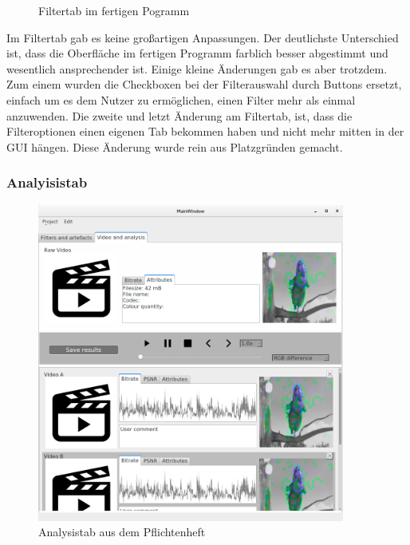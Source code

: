 \documentclass{scrartcl}
\begin{document}
{\begin{figure}[ht]
\caption{Filtertab im fertigen Pogramm}
\end{figure}
Im Filtertab gab es keine großartigen Anpassungen. Der deutlichste Unterschied ist, dass die Oberfläche im fertigen Programm farblich besser abgestimmt und wesentlich ansprechender ist. Einige kleine Änderungen gab es aber trotzdem. Zum einem wurden die Checkboxen bei der Filterauswahl durch Buttons ersetzt, einfach um es dem Nutzer zu ermöglichen, einen Filter mehr als einmal anzuwenden. Die zweite und letzt Änderung am Filtertab, ist, dass die Filteroptionen einen eigenen Tab bekommen haben und nicht mehr mitten in der GUI hängen. Diese Änderung wurde rein aus Platzgründen gemacht.
\newpage
\hfill
\newpage
\subsubsection{Analyisistab}
\bigskip
\begin{figure}[ht]
\centering
\includegraphics[width=0.9\textwidth]{Pictures/analysistabalt.png}
\caption{Analysistab aus dem Pflichtenheft}
\end{figure}
\begin{figure}[ht]
\centering

\end{figure}}
\end{document}
